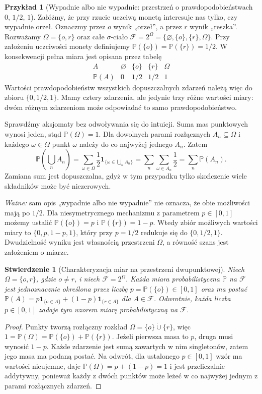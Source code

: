 \documentclass[11pt,a4paper,oneside]{report}
\numberwithin{equation}{chapter}
\theoremstyle{plain}
\newtheorem{stwierdzenie}[twierdzenie]{Stwierdzenie}
\theoremstyle{definition}
\newtheorem{przyklad}{Przykład}[chapter]
\theoremstyle{remark}
\newcommand{\Prob}{\mathbb{P}}
\newcommand{\ind}[1]{\mathbf{1}_{#1}}
\begin{document}
\begin{przyklad}[Wypadnie albo nie wypadnie: przestrzeń o prawdopodobieństwach $0$, $1/2$, $1$]
Załóżmy, że przy rzucie uczciwą monetą interesuje nas tylko,
czy wypadnie orzeł. Oznaczmy przez $o$ wynik „orzeł”, a przez
$r$ wynik „reszka”. Rozważamy
$\Omega=\{o,r\}$ oraz całe $\sigma$-ciało
$\mathcal F=2^\Omega=\{\varnothing,\{o\},\{r\},\Omega\}$.
Przy założeniu uczciwości monety definiujemy
$\Prob(\{o\})=\Prob(\{r\})=1/2$.
W konsekwencji pełna miara jest opisana przez tabelę
\[
\begin{array}{c|cccc}
A&\varnothing&\{o\}&\{r\}&\Omega\\ \hline
\Prob(A)&0&1/2&1/2&1
\end{array}
\]
Wartości prawdopodobieństw wszystkich dopuszczalnych zdarzeń
należą więc do zbioru $\{0,1/2,1\}$. Mamy cztery zdarzenia,
ale jedynie trzy różne wartości miary: dwóm różnym zdarzeniom
może odpowiadać to samo prawdopodobieństwo.

Sprawdźmy aksjomaty bez odwoływania się do intuicji. Suma
mas punktowych wynosi jeden, stąd $\Prob(\Omega)=1$.
Dla dowolnych parami rozłącznych $A_n\subseteq\Omega$ i
każdego $\omega\in\Omega$ punkt $\omega$ należy do
co najwyżej jednego $A_n$. Zatem
\[
\Prob\!\left(\bigcup_n A_n\right)
=\sum_{\omega\in\Omega}\frac12\ind{\{\omega\in\bigcup_n A_n\}}
=\sum_n\sum_{\omega\in A_n}\frac12
=\sum_n\Prob(A_n).
\]
Zamiana sum jest dopuszczalna, gdyż w tym przypadku tylko
skończenie wiele składników może być niezerowych.

\emph{Ważne:} sam opis „wypadnie albo nie wypadnie” nie oznacza,
że obie możliwości mają po $1/2$. Dla niesymetrycznego
mechanizmu z parametrem $p\in[0,1]$ możemy ustalić
$\Prob(\{o\})=p$ i $\Prob(\{r\})=1-p$.
Wtedy zbiór możliwych wartości miary to
$\{0,p,1-p,1\}$, który przy $p=1/2$ redukuje się
do $\{0,1/2,1\}$. Dwudzielność wyniku jest własnością
przestrzeni $\Omega$, a równość szans jest założeniem o miarze.
\end{przyklad}

\begin{stwierdzenie}[Charakteryzacja miar na przestrzeni dwupunktowej]
Niech $\Omega=\{o,r\}$, gdzie $o\ne r$, i niech
$\mathcal F=2^\Omega$. Każda miara probabilistyczna
$\Prob$ na $\mathcal F$ jest jednoznacznie określona przez
liczbę $p=\Prob(\{o\})\in[0,1]$ oraz ma postać
$\Prob(A)=p\ind{\{o\in A\}}+(1-p)\ind{\{r\in A\}}$
dla $A\in\mathcal F$. Odwrotnie, każda liczba $p\in[0,1]$
zadaje tym wzorem miarę probabilistyczną na $\mathcal F$.
\end{stwierdzenie}
\begin{proof}
Punkty tworzą rozłączny rozkład
$\Omega=\{o\}\mathbin{\dot\cup}\{r\}$, więc
$1=\Prob(\Omega)=\Prob(\{o\})+\Prob(\{r\})$.
Jeżeli pierwsza masa to $p$, druga musi wynosić $1-p$.
Każde zdarzenie jest sumą zawartych w nim singletonów, zatem
jego masa ma podaną postać. Na odwrót, dla ustalonego
$p\in[0,1]$ wzór ma wartości nieujemne, daje
$\Prob(\Omega)=p+(1-p)=1$ i jest przeliczalnie
addytywny, ponieważ każdy z dwóch punktów może leżeć
w co najwyżej jednym z parami rozłącznych zdarzeń.
\end{proof}
\end{document}
